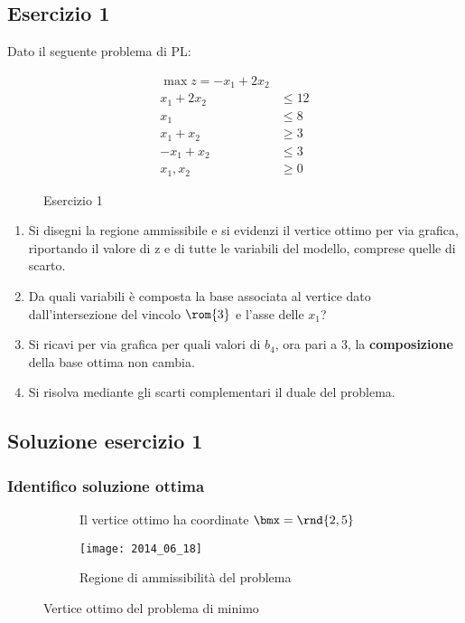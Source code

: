 \documentclass[\main/main.tex]{subfiles}
\begin{document}
\subsection{Esercizio 1}
Dato il seguente problema di PL:

\begin{figure}
  \begin{align*}
    \max z = -x_1 + 2x_2 \\
    x_1 + 2x_2 & \leq 12 \\
    x_1        & \leq 8  \\
    x_1 + x_2  & \geq 3  \\
    -x_1 + x_2 & \leq 3  \\
    x_1, x_2   & \geq 0
  \end{align*}
  \caption{Esercizio 1}
\end{figure}

\begin{enumerate}
  \item Si disegni la regione ammissibile e si evidenzi il vertice ottimo per via grafica, riportando il valore di z e di tutte le variabili del modello, comprese quelle di scarto.
  \item Da quali variabili è composta la base associata al vertice dato dall'intersezione del vincolo $\rom{3}$ e l'asse delle $x_1$?
  \item Si ricavi per via grafica per quali valori di $b_4$, ora pari a $3$, la \textbf{composizione} della base ottima non cambia.
  \item Si risolva mediante gli scarti complementari il duale del problema.
\end{enumerate}

\subsection{Soluzione esercizio 1}

\subsubsection*{Identifico soluzione ottima}

\begin{figure}
  \begin{subfigure}{0.49\textwidth}
    \caption{Il vertice ottimo ha coordinate $\bmx = \rnd{2,5}$}
  \end{subfigure}
  \begin{subfigure}{0.49\textwidth}
    \texttt{[image: 2014\_06\_18]}
    \caption{Regione di ammissibilità del problema}
  \end{subfigure}
  \caption{Vertice ottimo del problema di minimo}
\end{figure}
\end{document}
